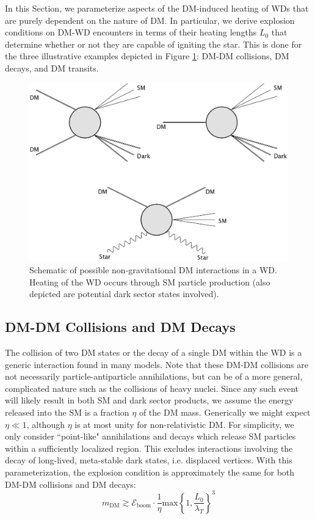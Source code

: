 \documentclass[twocolumn,showpacs,preprintnumbers,amsmath,amssymb,prd]{revtex4}
\newcommand{\Eboom}{\mathcal{E}_\text{boom}}
\begin{document}
In this Section, we parameterize aspects of the DM-induced heating of WDs that are purely dependent on the nature of DM. 
In particular, we derive explosion conditions on DM-WD encounters in terms of their heating lengths $L_0$ that determine whether or not they are capable of igniting the star.
This is done for the three illustrative examples depicted in Figure \ref{fig:feynman}: DM-DM collisions, DM decays, and DM transits. 
\begin{figure}
\includegraphics[scale=0.09]{feynmandiag.jpg}
\caption{Schematic of possible non-gravitational DM interactions in a WD. Heating of the WD occurs through SM particle production (also depicted are potential dark sector states involved).}
\label{fig:feynman}
\end{figure}

\subsection{DM-DM Collisions and DM Decays}
\label{sec:DMcoldecay}

The collision of two DM states or the decay of a single DM within the WD is a generic interaction found in many models.
Note that these DM-DM collisions are not necessarily particle-antiparticle annihilations, but can be of a more general, complicated nature such as the collisions of heavy nuclei.
Since any such event will likely result in both SM and dark sector products, we assume the energy released into the SM is a fraction $\eta$ of the DM mass.
Generically we might expect $\eta \ll 1$, although $\eta$ is at most unity for non-relativistic DM.
For simplicity, we only consider ``point-like" annihilations and decays which release SM particles within a sufficiently localized region. 
This excludes interactions involving the decay of long-lived, meta-stable dark states, i.e. displaced vertices. 
With this parameterization, the explosion condition is approximately the same for both DM-DM collisions and DM decays:
\begin{equation}
\label{eq:coldecay}
    m_\text{DM} \gtrsim \Eboom \cdot \frac{1}{\eta}
      \text{max}\left\{1, \frac{L_0}{\lambda_T}\right\}^3
\end{equation}
\end{document}

